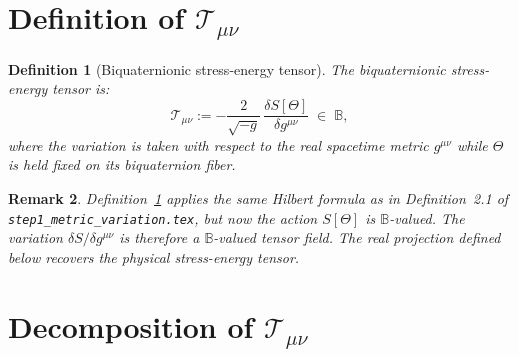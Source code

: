\documentclass[12pt]{article}
\newtheorem{definition}{Definition}[section]
\newtheorem{remark}[definition]{Remark}
\begin{document}
\section{Definition of $\mathcal{T}_{\mu\nu}$}

\begin{definition}[Biquaternionic stress-energy tensor]
\label{def:biquat_T}
The \emph{biquaternionic stress-energy tensor} is:
\begin{equation}
  \label{eq:calT_def}
  \mathcal{T}_{\mu\nu}
  := -\frac{2}{\sqrt{-g}}\,\frac{\delta S[\Theta]}{\delta g^{\mu\nu}}
  \;\in\; \mathbb{B},
\end{equation}
where the variation is taken with respect to the real spacetime metric
$g^{\mu\nu}$ while $\Theta$ is held fixed on its biquaternion fiber.
\end{definition}

\begin{remark}
  Definition~\ref{def:biquat_T} applies the same Hilbert formula as in
  Definition~2.1 of \texttt{step1\_metric\_variation.tex}, but now the
  action $S[\Theta]$ is $\mathbb{B}$-valued.  The variation
  $\delta S/\delta g^{\mu\nu}$ is therefore a $\mathbb{B}$-valued tensor
  field.  The real projection defined below recovers the physical
  stress-energy tensor.
\end{remark}

\section{Decomposition of $\mathcal{T}_{\mu\nu}$}
\end{document}
